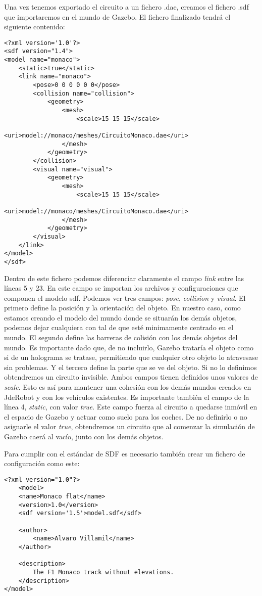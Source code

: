 Una vez tenemos exportado el circuito a un fichero .dae, creamos el fichero .sdf que importaremos en el mundo de Gazebo. El fichero finalizado tendrá el siguiente contenido:

\lstset{language=xml}
\begin{lstlisting}
<?xml version='1.0'?>
<sdf version="1.4">
<model name="monaco">
	<static>true</static>
	<link name="monaco">
		<pose>0 0 0 0 0 0</pose>
		<collision name="collision">
			<geometry>
				<mesh>
					<scale>15 15 15</scale>
					<uri>model://monaco/meshes/CircuitoMonaco.dae</uri>
				</mesh>
			</geometry>
		</collision>
		<visual name="visual">
			<geometry>
				<mesh>
					<scale>15 15 15</scale>
					<uri>model://monaco/meshes/CircuitoMonaco.dae</uri>
				</mesh>
			</geometry>
		</visual>
	</link>
</model>
</sdf>
\end{lstlisting}

Dentro de este fichero podemos diferenciar claramente el campo \textit{link} entre las líneas 5 y 23. En este campo se importan los archivos y configuraciones que componen el modelo sdf. Podemos ver tres campos: \textit{pose}, \textit{collision} y \textit{visual}. El primero define la posición y la orientación del objeto. En nuestro caso, como estamos creando el modelo del mundo donde se situarán los demás objetos, podemos dejar cualquiera con tal de que esté minimamente centrado en el mundo. El segundo define las barreras de colisión con los demás objetos del mundo. Es importante dado que, de no incluirlo, Gazebo trataría el objeto como si de un holograma se tratase, permitiendo que cualquier otro objeto lo atravesase sin problemas. Y el tercero define la parte que se ve del objeto. Si no lo definimos obtendremos un circuito invisible. Ambos campos tienen definidos unos valores de \textit{scale}. Esto es así para mantener una cohesión con los demás mundos creados en JdeRobot y con los vehículos existentes. Es importante también el campo de la línea 4, \textit{static}, con valor \textit{true}. Este campo fuerza al circuito a quedarse inmóvil en el espacio de Gazebo y actuar como suelo para los coches. De no definirlo o no asignarle el valor \textit{true}, obtendremos un circuito que al comenzar la simulación de Gazebo caerá al vacío, junto con los demás objetos.

Para cumplir con el estándar de SDF es necesario también crear un fichero de configuración como este:
\lstset{language=xml}
\begin{lstlisting}
<?xml version="1.0"?>
	<model>
	<name>Monaco flat</name>
	<version>1.0</version>
	<sdf version='1.5'>model.sdf</sdf>

	<author>
		<name>Alvaro Villamil</name>
	</author>

	<description>
		The F1 Monaco track without elevations.
	</description>
</model>
\end{lstlisting}

